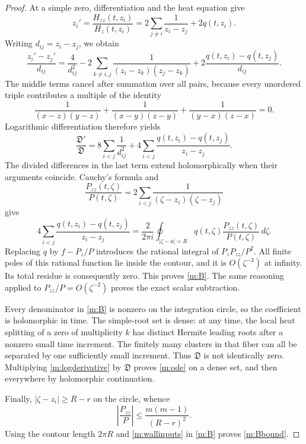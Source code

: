 \begin{proof}
At a simple zero, differentiation and the heat equation give
\begin{equation}\label{m:motion}
 z_i'=\frac{H_{zz}(t,z_i)}{H_z(t,z_i)}
      =2\sum_{j\ne i}\frac{1}{z_i-z_j}+2q(t,z_i).
\end{equation}
Writing $d_{ij}=z_i-z_j$, we obtain
\begin{equation}\label{m:pairmotion}
 \frac{z_i'-z_j'}{d_{ij}}
 =\frac{4}{d_{ij}^2}
 -2\sum_{k\ne i,j}\frac{1}{(z_i-z_k)(z_j-z_k)}
 +2\frac{q(t,z_i)-q(t,z_j)}{d_{ij}}.
\end{equation}
The middle terms cancel after summation over all pairs, because every
unordered triple contributes a multiple of the identity
\[
 \frac{1}{(x-z)(y-z)}+
 \frac{1}{(x-y)(z-y)}+
 \frac{1}{(y-x)(z-x)}=0.
\]
Logarithmic differentiation therefore yields
\begin{equation}\label{m:logderivative}
 \frac{\mathfrak D'}{\mathfrak D}
 =8\sum_{i<j}\frac{1}{d_{ij}^2}
  +4\sum_{i<j}\frac{q(t,z_i)-q(t,z_j)}{z_i-z_j}.
\end{equation}
The divided differences in the last term extend holomorphically when
their arguments coincide.  Cauchy's formula and
\[
 \frac{P_{zz}(t,\zeta)}{P(t,\zeta)}
    =2\sum_{i<j}\frac{1}{(\zeta-z_i)(\zeta-z_j)}
\]
give
\[
 4\sum_{i<j}\frac{q(t,z_i)-q(t,z_j)}{z_i-z_j}
 =\frac{2}{2\pi i}\oint_{|\zeta-a|=R}
             q(t,\zeta)\frac{P_{zz}(t,\zeta)}{P(t,\zeta)}\,d\zeta.
\]
Replacing $q$ by $f-P_z/P$ introduces the rational integral of
$P_zP_{zz}/P^2$.  All finite poles of this rational function lie inside
the contour, and it is $O(\zeta^{-3})$ at infinity.  Its total residue
is consequently zero.  This proves \eqref{m:B}.  The same reasoning
applied to $P_{zz}/P=O(\zeta^{-2})$ proves the exact scalar subtraction.

Every denominator in \eqref{m:B} is nonzero on the integration circle,
so the coefficient is holomorphic in time.  The simple-root set is
dense: at any time, the local heat splitting of a zero of multiplicity
$k$ has distinct Hermite leading roots after a nonzero small time
increment.  The finitely many clusters in that fiber can all be
separated by one sufficiently small increment.  Thus $\mathfrak D$
is not identically zero.  Multiplying \eqref{m:logderivative} by
$\mathfrak D$ proves \eqref{m:ode} on a dense set, and then everywhere
by holomorphic continuation.

Finally, $|\zeta-z_i|\geq R-r$ on the circle, whence
\[
 \left|\frac{P_{zz}}{P}\right|
       \leq\frac{m(m-1)}{(R-r)^2}.
\]
Using the contour length $2\pi R$ and \eqref{m:wallinputs} in
\eqref{m:B} proves \eqref{m:Bbound}.
\end{proof}

